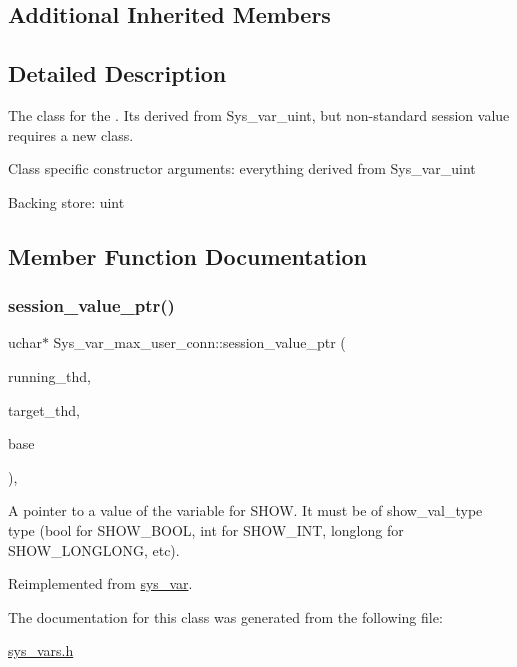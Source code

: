 \subsection*{Additional Inherited Members}


\subsection{Detailed Description}
The class for the . It\textquotesingle{}s derived from Sys\+\_\+var\+\_\+uint, but non-\/standard session value requires a new class.

Class specific constructor arguments\+: everything derived from Sys\+\_\+var\+\_\+uint

Backing store\+: uint 

\subsection{Member Function Documentation}
\mbox{\label{classSys__var__max__user__conn_a414aef777e5b4471d23c53702682e15f}} 
\subsubsection{\texorpdfstring{session\+\_\+value\+\_\+ptr()}{session\_value\_ptr()}}
{\footnotesize\ttfamily uchar$\ast$ Sys\+\_\+var\+\_\+max\+\_\+user\+\_\+conn\+::session\+\_\+value\+\_\+ptr (\begin{DoxyParamCaption}\item[{T\+HD $\ast$}]{running\+\_\+thd,  }\item[{T\+HD $\ast$}]{target\+\_\+thd,  }\item[{L\+E\+X\+\_\+\+S\+T\+R\+I\+NG $\ast$}]{base }\end{DoxyParamCaption})\hspace{0.3cm}{\ttfamily [inline]}, {\ttfamily [virtual]}}

A pointer to a value of the variable for S\+H\+OW. It must be of show\+\_\+val\+\_\+type type (bool for S\+H\+O\+W\+\_\+\+B\+O\+OL, int for S\+H\+O\+W\+\_\+\+I\+NT, longlong for S\+H\+O\+W\+\_\+\+L\+O\+N\+G\+L\+O\+NG, etc). 

Reimplemented from \mbox{\hyperlink{classsys__var_a3e511591aaf555d2bc2ce40a80b7e899}{sys\+\_\+var}}.



The documentation for this class was generated from the following file\+:\begin{DoxyCompactItemize}
\item 
\mbox{\hyperlink{sys__vars_8h}{sys\+\_\+vars.\+h}}\end{DoxyCompactItemize}

